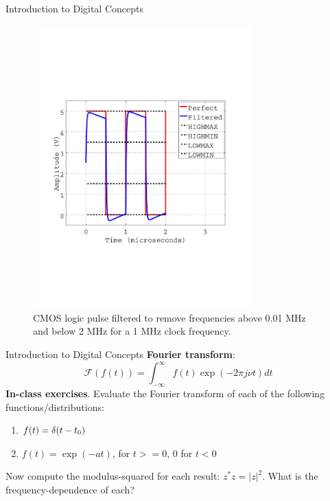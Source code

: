 \documentclass{beamer}
\begin{document}
\begin{frame}{Introduction to Digital Concepts}
\begin{figure}
\centering
\includegraphics[width=0.75\textwidth,trim=1cm 6cm 1cm 7cm,clip=true]{codes/January8_plot1.pdf}
\caption{\label{fig:pulse2} CMOS logic pulse filtered to remove frequencies above 0.01 MHz and below 2 MHz for a 1 MHz clock frequency.}
\end{figure}
\end{frame}

\begin{frame}{Introduction to Digital Concepts}
\alert{\textbf{Fourier transform}}:
\begin{equation}
\mathcal{F}(f(t)) = \int_{-\infty}^{\infty} f(t) \exp(-2\pi j\nu t) dt
\end{equation}
\textbf{In-class exercises}.  Evaluate the Fourier transform of each of the following functions/distributions:
\begin{enumerate}
\item $f(t) = \delta(t-t_{\rm 0})$
\item $f(t) = \exp(-at)$, for $t>=0$, $0$ for $t<0$
\end{enumerate}
Now compute the modulus-squared for each result: $z^{*}z = |z|^2$.  What is the frequency-dependence of each?
\end{frame}
\end{document}

